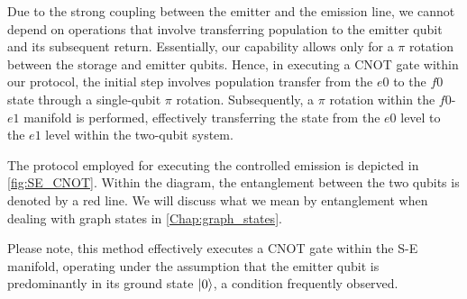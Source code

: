 Due to the strong coupling between the emitter and the emission line, we cannot depend on operations that involve transferring population to the emitter qubit and its subsequent return.
Essentially, our capability allows only for a $\pi$ rotation between the storage and emitter qubits.
Hence, in executing a CNOT gate within our protocol, the initial step involves population transfer from the $e0$ to the $f0$ state through a single-qubit $\pi$ rotation. 
Subsequently, a $\pi$ rotation within the $f0$-$e1$ manifold is performed, effectively transferring the state from the $e0$ level to the $e1$ level within the two-qubit system.

The protocol employed for executing the controlled emission is depicted in \cref{fig:SE_CNOT}.
Within the diagram, the entanglement between the two qubits is denoted by a red line. We will discuss what we mean by entanglement when dealing with graph states in \cref{Chap:graph_states}.

Please note, this method effectively executes a CNOT gate within the S-E manifold, operating under the assumption that the emitter qubit is predominantly in its ground state $\ket{0}$, a condition frequently observed.
